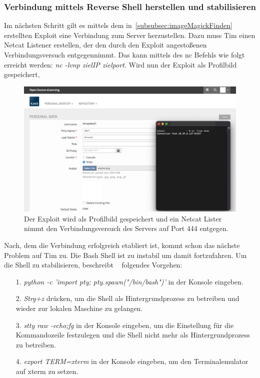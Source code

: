 \documentclass[10pt, a4paper,onecolumn ,titlepage]{article}
\begin{document}
    \subsubsection{Verbindung mittels Reverse Shell herstellen und stabilisieren}
    \label{subsubsec:verbindungHerstellen}
    Im nächsten Schritt gilt es mittels dem in~\ref{subsubsec:imageMagickFinden} erstellten Exploit eine Verbindung zum Server herzustellen.
    Dazu muss Tim einen Netcat Listener erstellen, der den durch den Exploit angestoßenen Verbindungsversuch entgegennimmt.
    Das kann mittels des nc Befehls wie folgt erreicht werden: \textit{nc -lvnp zielIP zielport}.
    Wird nun der Exploit als Profilbild gespeichert,
    \begin{figure}[H]
        \centering
        \includegraphics[width=1\textwidth]{storyline_bilder_vm2/VerbindungDa}
        \caption{Der Exploit wird als Profilbild gespeichert und ein Netcat Lister nimmt den Verbindungsversuch des Servers auf Port 444 entgegen.}
        \label{fig:exploitHochladen}
    \end{figure}
    \noindent
    Nach, dem die Verbindung erfolgreich etabliert ist, kommt schon das nächste Problem auf Tim zu.
    Die Bash Shell ist zu instabil um damit fortzufahren.
    Um die Shell zu stabilisieren, beschreibt ~\textcite{shellStabilisieren} folgendes Vorgehen:

    \begin{enumerate}[leftmargin=2.5cm]
        \item[1.] \textit{python -c 'import pty; pty.spawn("/bin/bash")'}  in der Konsole eingeben.
        \item[2.] \textit{Strg+z}  drücken, um die Shell als Hintergrundprozess zu betreiben und wieder zur lokalen Maschine zu gelangen.
        \item[3.] \textit{stty raw -echo;fg}  in der Konsole eingeben, um die Einstellung für die Kommandozeile festzulegen und die Shell nicht mehr als Hintergrundprozess zu betreiben.
        \item[4.] \textit{export TERM=xterm}  in der Konsole eingeben, um den Terminalemulator auf xterm zu setzen.
    \end{enumerate}
\end{document}
